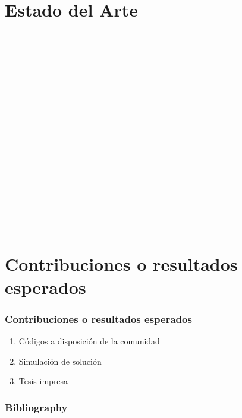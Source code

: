 \documentclass[
	11pt, %
]{beamer}
\begin{document}
\section{Estado del Arte}

\begin{frame}
  \cite{CIESLEWSKI2017}\\
  \cite{USENKO2017}\\
  \cite{MOHTA2017}\\
\end{frame}
\begin{frame}
  \cite{LIN2017}\\
  \cite{PAPACHRISTOS2017}\\
  \cite{OLEYNIKOVA2018}\\
\end{frame}
\begin{frame}
  \cite{GAO2018}\\
  \cite{FLORENCE2018}\\
  \cite{SELIN2019}\\
\end{frame}
\begin{frame}
  \cite{COLLINS2019}\\
  \cite{CINVES2021}\\
  \cite{RACER2022}\\
\end{frame}
\begin{frame}
  \cite{WESTHEIDER2023}\\
  \cite{BARTOLOMEI2023}\\
\end{frame}

\section{Contribuciones o resultados esperados}

\begin{frame}

  \frametitle{Contribuciones o resultados esperados}

  \begin{enumerate}
  \item<1-> Códigos a disposición de la comunidad
  \item<2-> Simulación de solución
  \item<3-> Tesis impresa
  \end{enumerate}
  
\end{frame}

\begin{frame}
  \frametitle{Bibliography}
  
  
\end{frame}
\end{document}
